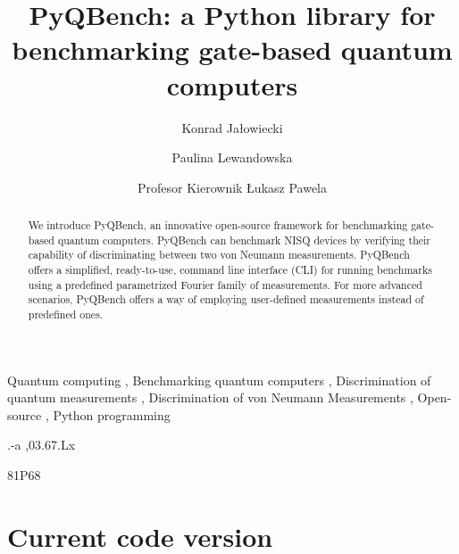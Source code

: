 \documentclass[preprint,12pt, a4paper, dvipsnames]{elsarticle}
\newcommand{\1}{{\rm 1\hspace{-0.9mm}l}}
\begin{document}
\begin{frontmatter}

\title{PyQBench: a Python library for benchmarking gate-based quantum computers}

\author{Konrad Jałowiecki}

\author{Paulina Lewandowska}
\author{Profesor Kierownik \L ukasz Pawela}

\address{Institute of Theoretical and Applied Informatics, Polish Academy
	of Sciences, Ba{\l}tycka 5, 44-100 Gliwice, Poland}

\begin{abstract}
We introduce PyQBench, an innovative open-source framework for benchmarking
gate-based quantum computers. PyQBench can benchmark NISQ devices by verifying their capability of
discriminating between two von Neumann measurements. PyQBench offers a simplified, ready-to-use,
command line interface (CLI) for running benchmarks using a predefined parametrized Fourier
family of measurements. For more advanced scenarios, PyQBench offers a way of employing user-defined
measurements instead of predefined ones.

\end{abstract}

\begin{keyword}
Quantum computing \sep
Benchmarking quantum computers \sep
Discrimination of quantum measurements \sep
Discrimination of von Neumann Measurements \sep
Open-source \sep
Python programming

.-a \sep 03.67.Lx

\MSC 81P68

\end{keyword}

\end{frontmatter}



\section*{Current code version}
\label{}
\end{document}
